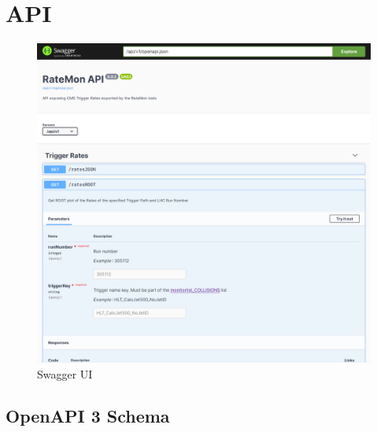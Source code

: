 \section{API}

\cite{ExposefunctionalitieswithaRestfulAPI8MergeRequestsCMSTSGFOGratemonGitLab-2020-10-07}

\begin{figure}
    \centerline{
        \includegraphics[width=0.8\paperwidth]{figures/swagger-ui}}
    \caption{Swagger UI}
    \label{fig:swagger-ui}
\end{figure}

\subsection{OpenAPI 3 Schema}

